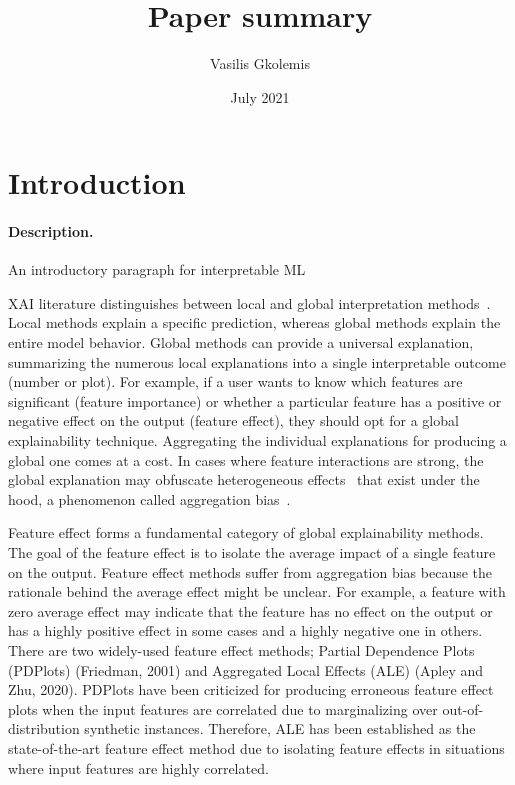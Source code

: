 \documentclass{article}
\title{Paper summary}
\author{Vasilis Gkolemis}
\date{July 2021}
\begin{document}
\maketitle

\section{Introduction}
\label{sec:introduction}

\paragraph{Description.}

An introductory paragraph for interpretable ML

XAI literature distinguishes between local and global interpretation methods~\cite{Molnar2020}. Local methods explain a specific prediction, whereas global methods explain the entire model behavior. Global methods can provide a universal explanation, summarizing the numerous local explanations into a single interpretable outcome (number or plot). For example, if a user wants to know which features are significant (feature importance) or whether a particular feature has a positive or negative effect on the output (feature effect), they should opt for a global explainability technique. Aggregating the individual explanations for producing a global one comes at a cost. In cases where feature interactions are strong, the global explanation may obfuscate heterogeneous effects~\cite{Herbinger2022} that exist under the hood, a phenomenon called aggregation bias~\cite{Mehrabi2019}.

Feature effect forms a fundamental category of global explainability methods. The goal of the feature effect is to isolate the average impact of a single feature on the output. Feature effect methods suffer from aggregation bias because the rationale behind the average effect might be unclear. For example, a feature with zero average effect may indicate that the feature has no effect on the output or has a highly positive effect in some cases and a highly negative one in others. There are two widely-used feature effect methods; Partial Dependence Plots (PDPlots) (Friedman, 2001) and Aggregated Local Effects (ALE) (Apley and Zhu, 2020). PDPlots have been criticized for producing erroneous feature effect plots when the input features are correlated due to marginalizing over out-of-distribution synthetic instances. Therefore, ALE has been established as the state-of-the-art feature effect method due to isolating feature effects in situations where input features are highly correlated.
\end{document}
